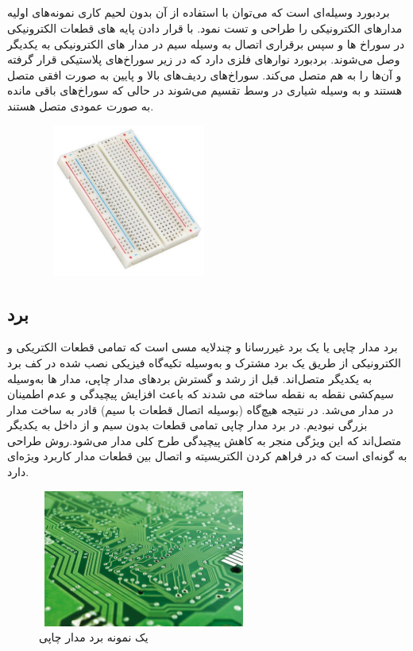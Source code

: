 \subsection{}
بردبورد وسیله‌ای است که می‌توان با استفاده از آن بدون لحیم کاری نمونه‌های اولیه مدارهای الکترونیکی را طراحی و تست نمود. با قرار دادن پایه های قطعات الکترونیکی در سوراخ ها و سپس برقراری اتصال به وسیله سیم در مدار های الکترونیکی به یکدیگر وصل می‌شوند. بردبورد نوارهای فلزی دارد که در زیر سوراخ‌های پلاستیکی قرار گرفته و آن‌ها را به هم متصل می‌کند. سوراخ‌های ردیف‌های بالا و پایین به صورت افقی متصل هستند و به وسیله شیاری در وسط تقسیم می‌شوند در حالی که سوراخ‌های باقی مانده به صورت عمودی متصل هستند.
    \begin{figure}[!h]
	\centering
	\includegraphics[height=5cm,width=6cm]{./Images/CH3/Breadboard.jpg}
	\caption{}
	\label{برد بورد}
	\end{figure} 
\subsection{برد }

برد مدار چاپی یا 
\unskip{}
یک برد  غیررسانا و چندلایه مسی است که تمامی قطعات الکتریکی و الکترونیکی از طریق یک برد مشترک و به‌وسیله تکیه‌گاه فیزیکی نصب شده در کف برد به یکدیگر متصل‌اند. قبل از رشد و گسترش بردهای مدار چاپی، مدار ها به‌وسیله سیم‌کشی نقطه به نقطه ساخته می شدند که باعث افزایش پیچیدگی و عدم اطمینان در مدار می‌شد. در نتیجه هیچ‌گاه (بوسیله اتصال قطعات با سیم) قادر به ساخت مدار بزرگی نبودیم. در برد مدار چاپی تمامی قطعات بدون سیم و از داخل به یکدیگر متصل‌اند که این ویژگی منجر به کاهش پیچیدگی طرح کلی مدار می‌شود.روش طراحی  به گونه‌ای است که  در فراهم کردن الکتریسیته و اتصال بین قطعات مدار کاربرد ویژه‌‌ای دارد.

    \begin{figure}[!h]
	\centering
	\includegraphics[height=4.5cm,width=7cm]{./Images/CH3/PCB.jpg}
	\caption{یک نمونه برد مدار چاپی}
	\label{مدار چاپی}
	\end{figure} 

